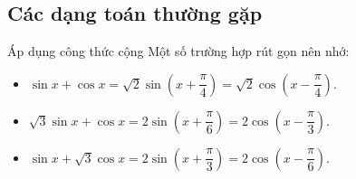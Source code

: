 \subsection{Các dạng toán thường gặp}
\begin{dang}{Áp dụng công thức cộng}
	Một số trường hợp rút gọn nên nhớ:
	\begin{itemize}
		\item $\sin x + \cos x = \sqrt{2}\sin\left(x+\dfrac{\pi}{4}\right) = \sqrt{2}\cos \left(x-\dfrac{\pi}{4}\right)$.
		\item $\sqrt{3}\sin x + \cos x = 2\sin \left(x+\dfrac{\pi}{6}\right) = 2\cos \left(x-\dfrac{\pi}{3}\right)$.
		\item $\sin x + \sqrt{3}\cos x = 2\sin \left(x+ \dfrac{\pi}{3}\right) = 2\cos \left(x-\dfrac{\pi}{6}\right)$.
	\end{itemize}
\end{dang}
